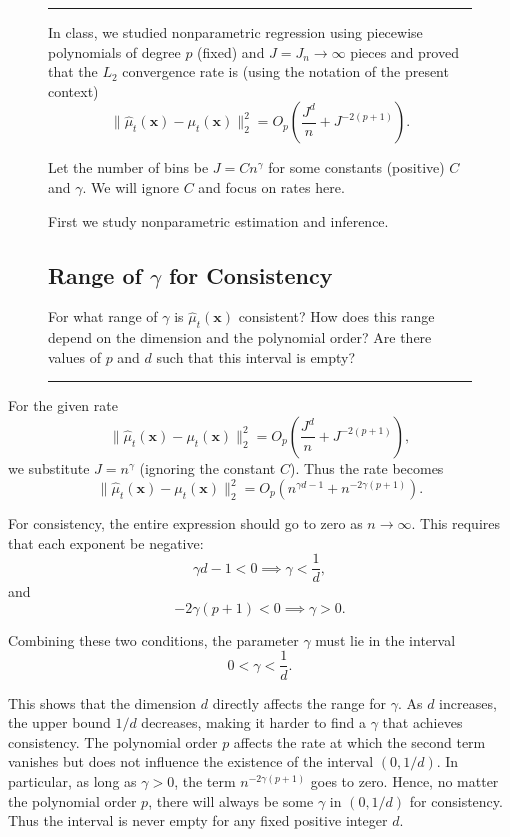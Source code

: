 \documentclass{article}
\newenvironment{colorparagraph}[1]{\par\color{#1}}{\par}
\begin{document}
\begin{figure}[H]
  \begin{colorparagraph}{questioncolor}
  \rule{\textwidth}{0.5pt}
  In class, we studied nonparametric regression using piecewise polynomials of degree \( p \) (fixed) and \( J = J_n \to \infty \) pieces and proved that the \( L_2 \) convergence rate is (using the notation of the present context)
  \[
  \|\hat{\mu}_t(\mathbf{x}) - \mu_t(\mathbf{x})\|_2^2 = O_p\left( \frac{J^d}{n} + J^{-2(p+1)} \right).
  \]

  Let the number of bins be \( J = C n^\gamma \) for some constants (positive) \( C \) and \( \gamma \). We will ignore \( C \) and focus on rates here.

  First we study nonparametric estimation and inference.

  \label{q1c}
  \subsection{Range of \(\gamma\) for Consistency}

  For what range of \( \gamma \) is \( \hat{\mu}_t(\mathbf{x}) \) consistent? How does this range depend on the dimension and the polynomial order? Are there values of \( p \) and \( d \) such that this interval is empty?
  
  \rule{\textwidth}{0.5pt}
  \end{colorparagraph}
\end{figure}

For the given rate
\[
\|\hat{\mu}_t(\mathbf{x}) - \mu_t(\mathbf{x})\|_2^2 = O_p\left( \frac{J^d}{n} + J^{-2(p+1)} \right),
\]
we substitute \( J = n^\gamma \) (ignoring the constant \(C\)). Thus the rate becomes
\[
\|\hat{\mu}_t(\mathbf{x}) - \mu_t(\mathbf{x})\|_2^2 = O_p\left( n^{\gamma d - 1} + n^{-2\gamma(p+1)} \right).
\]

For consistency, the entire expression should go to zero as \( n \to \infty \). This requires that each exponent be negative:
\[
\gamma d - 1 < 0 \implies \gamma < \frac{1}{d},
\]
and
\[
-2\gamma(p+1) < 0 \implies \gamma > 0.
\]

Combining these two conditions, the parameter \(\gamma\) must lie in the interval
\[
0 < \gamma < \frac{1}{d}.
\]

This shows that the dimension \( d \) directly affects the range for \(\gamma\). As \( d \) increases, the upper bound \( 1/d \) decreases, making it harder to find a \(\gamma\) that achieves consistency. The polynomial order \( p \) affects the rate at which the second term vanishes but does not influence the existence of the interval \((0, 1/d)\). In particular, as long as \(\gamma > 0\), the term \( n^{-2\gamma(p+1)} \) goes to zero. Hence, no matter the polynomial order \( p \), there will always be some \(\gamma\) in \((0, 1/d)\) for consistency. Thus the interval is never empty for any fixed positive integer \( d \).
  
\end{document}
